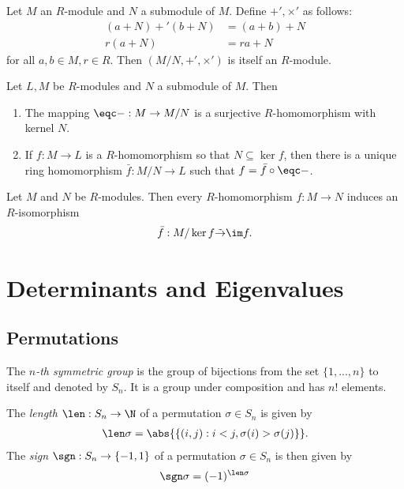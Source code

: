 \documentclass{article}
\begin{document}
\begin{theorem}[Notes 3.7.31]
	Let $M$ an $R$-module and $N$ a submodule of $M$. Define $+',\times'$ as follows:
	\begin{align*}
		(a+N)+'(b+N) & = (a+b)+N \\
		r(a+N)       & = ra + N
	\end{align*}
	for all $a,b\in M,r\in R$. Then $(M/N,+',\times')$ is itself an $R$-module.
\end{theorem}

\begin{theorem}[Notes 3.7.32]
	Let $L,M$ be $R$-modules and $N$ a submodule of $M$. Then
	\begin{enumerate}
		\item The mapping $\eqc - : M\to M/N$ is a surjective $R$-homomorphism with kernel $N$.
		\item If $f:M\to L$ is a $R$-homomorphism so that $N\subseteq\ker f$, then there
		      is a unique ring homomorphism $\bar f:M/N\to L$ such that $f=\bar f\circ\eqc -$.
	\end{enumerate}
\end{theorem}

\begin{theorem}
	Let $M$ and $N$ be $R$-modules. Then every $R$-homomorphism $f:M\to N$ induces an $R$-isomorphism
	\begin{align*}
		\bar f:M/\ker f \tilde\to \im f.
	\end{align*}
\end{theorem}

\section{Determinants and Eigenvalues}

\subsection{Permutations}

\begin{definition}
	The \emph{$n$-th symmetric group} is the group of bijections from the set $\{1,...,n\}$ to itself
	and denoted by $S_n$. It is a group under composition and has $n!$ elements.
\end{definition}

\begin{definition}
	The \emph{length} $\len:S_n\to\N$ of a permutation $\sigma\in S_n$ is given by
	\begin{align*}
		\len \sigma = \abs{\{(i,j):i<j,\sigma(i)>\sigma(j)\}}.
	\end{align*}
	The \emph{sign} $\sgn:S_n\to\{-1,1\}$ of a permutation $\sigma\in S_n$ is then
	given by
	\begin{align*}
		\sgn \sigma = (-1)^{\len \sigma}
	\end{align*}
\end{definition}
\end{document}
